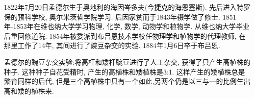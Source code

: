 \documentclass[11pt,a4paper,boxed]{caspset}
\newlength\picwidth
\newlength\pichigh
\begin{document}
\begin{window}
1822年7月20日孟德尔生于奥地利的海因岑多夫(今捷克的海恩塞斯). 先后进入特罗保的预科学校, 奥尔米茨哲学院学习. 后因家贫而于1843年辍学做了修士. 1851年-1853年在维也纳大学学习物理, 化学, 数学, 动物学和植物学. 从维也纳大学毕业后重回修道院. 1854年被委派到布吕恩技术学校任物理学和植物学的代理教师, 在那里工作了14年, 其间进行了豌豆杂交的实验. 1884年1月6日卒于布吕恩.

孟德尔的豌豆杂交实验:将高杆和矮杆豌豆进行了人工杂交, 获得了只产生高植株的种子. 这种种子自花受精时, 产生的高植株和矮植株是3:1. 这样产生的矮植株总是繁育同样的后代, 但是三个高植株中只有一个如此,另两个仍是以三与一的比例生出高和矮的植株来.
\end{window}
\end{document}
